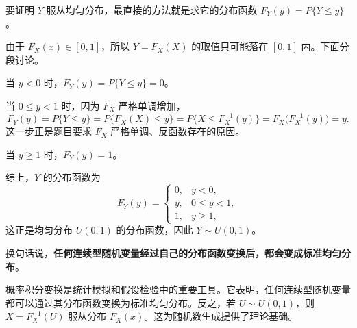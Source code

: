 ﻿\documentclass[lang=cn,11pt]{elegantbook}
\begin{document}
\begin{solution}
要证明 $Y$ 服从均匀分布，最直接的方法就是求它的分布函数 $F_Y(y)=P\{Y\le y\}$。

由于 $F_X(x)\in[0,1]$，所以 $Y=F_X(X)$ 的取值只可能落在 $[0,1]$ 内。下面分段讨论。

当 $y < 0$ 时，$F_Y(y) = P\{Y \le y\} = 0$。

当 $0 \le y < 1$ 时，因为 $F_X$ 严格单调增加，
\[
F_Y(y)=P\{Y\le y\}=P\{F_X(X)\le y\}=P\{X\le F_X^{-1}(y)\}=F_X\!\bigl(F_X^{-1}(y)\bigr)=y.
\]
这一步正是题目要求 $F_X$ 严格单调、反函数存在的原因。

当 $y \ge 1$ 时，$F_Y(y) = 1$。

综上，$Y$ 的分布函数为
\[
F_Y(y) = \begin{cases}
0, & y < 0, \\
y, & 0 \le y < 1, \\
1, & y \ge 1,
\end{cases}
\]
这正是均匀分布 $U(0,1)$ 的分布函数，因此 \(Y\sim U(0,1)\)。

换句话说，\textbf{任何连续型随机变量经过自己的分布函数变换后，都会变成标准均匀分布}。
\end{solution}

\begin{remark}
概率积分变换是统计模拟和假设检验中的重要工具。它表明，任何连续型随机变量都可以通过其分布函数变换为标准均匀分布。反之，若 $U \sim U(0,1)$，则 $X = F_X^{-1}(U)$ 服从分布 $F_X(x)$。这为随机数生成提供了理论基础。
\end{remark}
\end{document}
